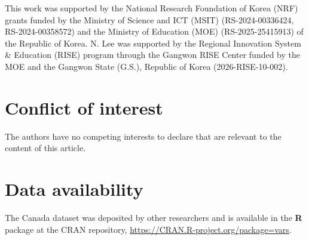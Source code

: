 This work was supported by the National Research Foundation of Korea (NRF) grants funded by the Ministry of Science and ICT (MSIT) (RS-2024-00336424, RS-2024-00358572) and the Ministry of Education (MOE) (RS-2025-25415913) of the Republic of Korea. N. Lee was supported by the Regional Innovation System \& Education (RISE) program through the Gangwon RISE Center funded by the MOE and the Gangwon State (G.S.), Republic of Korea (2026-RISE-10-002).

\section*{Conflict of interest}\label{conflict-of-interest}

The authors have no competing interests to declare that are relevant to the content of this article.

\section*{Data availability}\label{data-availability}

The Canada dataset was deposited by other researchers and is available in the \textbf{R} package  at the CRAN repository, \url{https://CRAN.R-project.org/package=vars}.



\address{%
Namgil Lee\\
Kangwon National University\\%
Department of Information Statistics, Kangwon National University, Chuncheon, Gangwon 24341, Republic of Korea\\ Bionsight, Chuncheon, Gangwon 24341, Republic of Korea\\
%
%
\textit{ORCID: \href{https://orcid.org/0000-0003-0593-9028}{0000-0003-0593-9028}}\\%
\href{mailto:namgil.lee@kangwon.ac.kr}{\nolinkurl{namgil.lee@kangwon.ac.kr}}%
}

\address{%
Sung-Ho Kim\\
KAIST\\%
Department of Mathematical Sciences, KAIST, Daejeon 34141, Republic of Korea\\
%
%
%
\href{mailto:sung-ho.kim@kaist.edu}{\nolinkurl{sung-ho.kim@kaist.edu}}%
}
